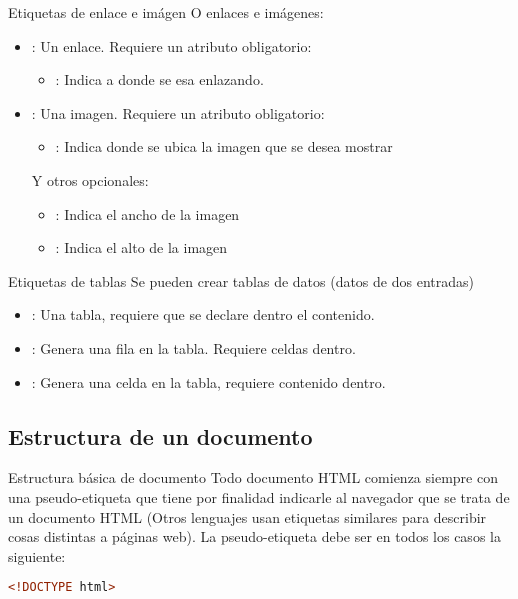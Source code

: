 \begin{frame}{Etiquetas de enlace e imágen}
	O enlaces e imágenes:
	\begin{itemize}
		\item {}: Un enlace. Requiere un atributo obligatorio:
		\begin{itemize}
			\item {}: Indica a donde se esa enlazando.
		\end{itemize}
		\item {}: Una imagen. Requiere un atributo obligatorio:
		\begin{itemize}
			\item {}: Indica donde se ubica la imagen que se desea mostrar
		\end{itemize}
		Y otros opcionales:
		\begin{itemize}
			\item {}: Indica el ancho de la imagen
			\item {}: Indica el alto de la imagen
		\end{itemize}
	\end{itemize}
\end{frame}


\begin{frame}{Etiquetas de tablas}
	Se pueden crear tablas de datos (datos de dos entradas)
	\begin{itemize}
		\item {}: Una tabla, requiere que se declare dentro el contenido.
		\item {}: Genera una fila en la tabla. Requiere celdas dentro.
		\item {}: Genera una celda en la tabla, requiere contenido dentro.
	\end{itemize}
\end{frame}


\subsection{Estructura de un documento}


\begin{frame}[fragile]{Estructura básica de documento}
	Todo documento HTML comienza siempre con una pseudo-etiqueta que tiene por
	finalidad indicarle al navegador que se trata de un documento HTML (Otros
	lenguajes usan etiquetas similares para describir cosas distintas a páginas
	web).
	\jump
	La pseudo-etiqueta debe ser en todos los casos la siguiente:
	\begin{lstlisting}[language=HTML]
<!DOCTYPE html>
	\end{lstlisting}
\end{frame}

